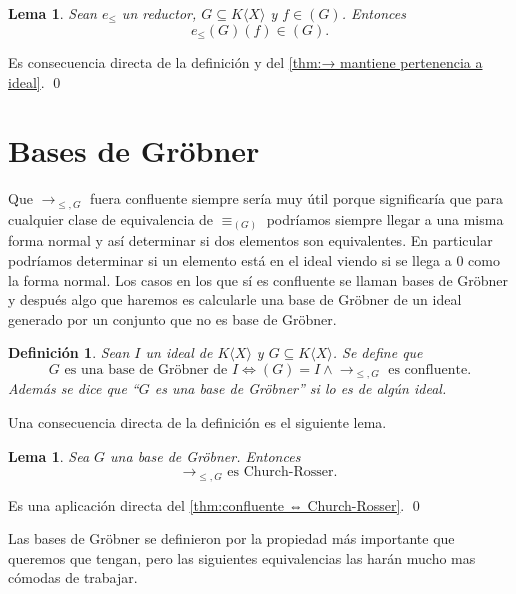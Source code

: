\documentclass[12pt]{report}
\theoremstyle{customstyle}
\newtheorem{definition}[theorem]{Definición}
\newtheorem{lemma}[theorem]{Lema}
\renewenvironment{proof}[1][\proofname]{{\noindent \bfseries #1: }}{\qed} %
\theoremstyle{factstyle}
\begin{document}
\begin{lemma}\label{lemma:e mantiene pertenencia a ideal}
  Sean $e_≤$ un reductor, $G ⊆ K⟨X⟩$ y $f ∈ (G)$. Entonces
  \[ e_≤(G)(f) ∈ (G) \text{.}\]
\end{lemma}
\begin{proof}
  Es consecuencia directa de la definición y del \cref{thm:→ mantiene pertenencia a ideal}.
\end{proof}

\section{Bases de Gröbner}

Que $→_{≤, G}$ fuera confluente siempre sería muy útil porque significaría que para cualquier clase de equivalencia de $≡_{(G)}$ podríamos siempre llegar a una misma forma normal y así determinar si dos elementos son equivalentes. En particular podríamos determinar si un elemento está en el ideal viendo si se llega a $0$ como la forma normal. Los casos en los que sí es confluente se llaman bases de Gröbner y después algo que haremos es calcularle una base de Gröbner de un ideal generado por un conjunto que no es base de Gröbner.

\begin{definition}\label{def:base de Gröbner}
  Sean $I$ un ideal de $K⟨X⟩$ y $G ⊆ K⟨X⟩$. Se define que
  \[G\text{ es una base de Gröbner de }I ⇔ (G) = I ∧ →_{≤, G}\text{ es confluente} \text{.} \]
  Además se dice que ``$G$ es una base de Gröbner'' si lo es de algún ideal.
\end{definition}

Una consecuencia directa de la definición es el siguiente lema.

\begin{lemma}\label{lemma:→ gröbner es Church-Rosser}
  Sea $G$ una base de Gröbner. Entonces
  \[→_{≤, G}\text{ es Church-Rosser.}\]
\end{lemma}
\begin{proof}
  Es una aplicación directa del \cref{thm:confluente ⇔ Church-Rosser}.
\end{proof}

Las bases de Gröbner se definieron por la propiedad más importante que queremos que tengan, pero las siguientes equivalencias las harán mucho mas cómodas de trabajar.
\end{document}
